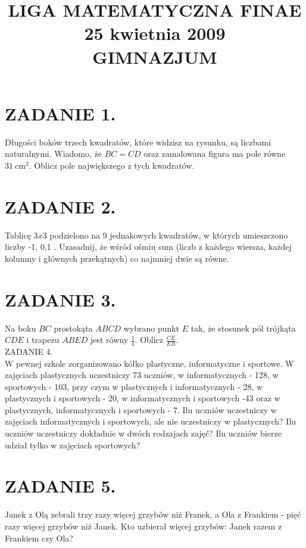 \documentclass[10pt]{article}
\title{LIGA MATEMATYCZNA FINAE \\
 25 kwietnia 2009 \\
 GIMNAZJUM }
\author{}
\date{}
\begin{document}
\maketitle
\section*{ZADANIE 1.}
Długości boków trzech kwadratów, które widzisz na rysunku, są liczbami naturalnymi. Wiadomo, że \(B C=C D\) oraz zamalowana figura ma pole równe \(31 \mathrm{~cm}^{2}\). Oblicz pole największego z tych kwadratów.

\section*{ZADANIE 2.}
Tablicę \(3 x 3\) podzielono na 9 jednakowych kwadratów, w których umieszczono liczby -1, 0,1 . Uzasadnij, że wśród ośmiu sum (liczb z każdego wiersza, każdej kolumny i głównych przekątnych) co najmniej dwie są równe.

\section*{ZADANIE 3.}
Na boku \(B C\) prostokąta \(A B C D\) wybrano punkt \(E\) tak, że stosunek pól trójkąta \(C D E\) i trapezu \(A B E D\) jest równy \(\frac{1}{4}\). Oblicz \(\frac{C E}{E B}\).\\
ZADANIE 4.\\
W pewnej szkole zorganizowano kółko plastyczne, informatyczne i sportowe. W zajęciach plastycznych uczestniczy 73 uczniów, w informatycznych - 128, w sportowych - 103, przy czym w plastycznych i informatycznych - 28, w plastycznych i sportowych - 20, w informatycznych i sportowych -43 oraz w plastycznych, informatycznych i sportowych - 7. Ilu uczniów uczestniczy w zajęciach informatycznych i sportowych, ale nie uczestniczy w plastycznych? Ilu uczniów uczestniczy dokładnie w dwóch rodzajach zajęć? Ilu uczniów bierze udział tylko w zajęciach sportowych?

\section*{ZADANIE 5.}
Janek z Olą zebrali trzy razy więcej grzybów niż Franek, a Ola z Frankiem - pięć razy więcej grzybów niż Janek. Kto uzbierał więcej grzybów: Janek razem z Frankiem czy Ola?
\end{document}
